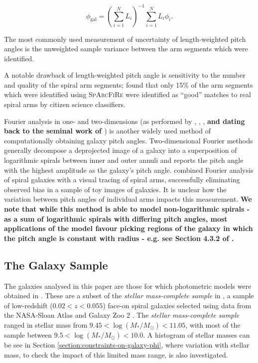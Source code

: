\begin{equation}
  \phi_\mathrm{gal} = \left(\sum_{i=1}^{N}L_i\right)^{-1}\sum_{i=1}^{N}L_i \phi_i.
\end{equation}

The most commonly used measurement of uncertainty of length-weighted pitch angles is the unweighted sample variance between the arm segments which were identified.

A notable drawback of length-weighted pitch angle is sensitivity to the number and quality of the spiral arm segments; \citet{2017MNRAS.472.2263H} found that only 15\% of the arm segments which were identified using \textsc{SpArcFiRe} \citep{2014ApJ...790...87D} were identified as ``good'' matches to real spiral arms by citizen science classifiers.

Fourier analysis in one- and two-dimensions (as performed by \citealt{2019arXiv190804246D}, \citealt{2012ApJS..199...33D}, \citealt{2018MNRAS.474.2594M}, \textbf{and dating back to the seminal work of \citealt{ConsidereAthanassoula1988}}) is another widely used method of computationally obtaining galaxy pitch angles. Two-dimensional Fourier methods generally decompose a deprojected image of a galaxy into a superposition of logarithmic spirals between inner and outer annuli \citep{2012ApJS..199...33D} and reports the pitch angle with the highest amplitude as the galaxy's pitch angle. \citet{2020MNRAS.493.3854H} combined Fourier analysis of spiral galaxies with a visual tracing of spiral arms, successfully eliminating observed bias in a sample of toy images of galaxies. It is unclear how the variation between pitch angles of individual arms impacts this measurement. \textbf{We note that while this method is able to model non-logarithmic spirals - as a sum of logarithmic spirals with differing pitch angles, most applications of the model favour picking regions of the galaxy in which the pitch angle is constant with radius - e.g. see Section 4.3.2 of \citealt{2012ApJS..199...33D}.}

\subsection{The Galaxy Sample}
The galaxies analysed in this paper are those for which photometric models were obtained in \citet{2020arXiv200610450L}. These are a subset of the \textit{stellar mass-complete sample} in \citet{2017MNRAS.472.2263H}, a sample of low-redshift ($0.02 < z < 0.055$) face-on spiral galaxies selected using data from the NASA-Sloan Atlas \citep{2011AJ....142...31B} and Galaxy Zoo 2 \citep{Willett2013:1308.3496v2}. The \textit{stellar mass-complete sample} ranged in stellar mass from $9.45 < \log(M_* / M_\odot) < 11.05$, with most of the sample between $9.5 < \log(M_* / M_\odot) < 10.0$. A histogram of stellar masses can be see in Section \ref{section:constraints-on-galaxy-phi}, where variation with stellar mass, to check the impact of this limited mass range, is also investigated. 

